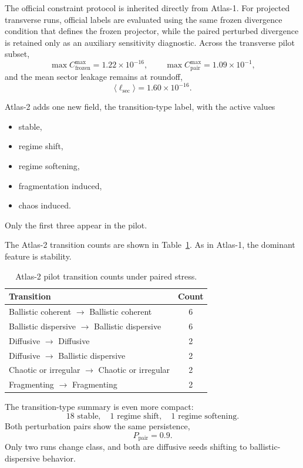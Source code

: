 \documentclass[11pt]{article}
\begin{document}
The official constraint protocol is inherited directly from Atlas-1. For projected transverse runs, official labels are evaluated using the same frozen divergence condition that defines the frozen projector, while the paired perturbed divergence is retained only as an auxiliary sensitivity diagnostic. Across the transverse pilot subset,
\begin{equation}
\max C^{\max}_{\mathrm{frozen}} = 1.22 \times 10^{-16},
\qquad
\max C^{\max}_{\mathrm{pair}} = 1.09 \times 10^{-1},
\end{equation}
and the mean sector leakage remains at roundoff,
\begin{equation}
\langle \ell_{\mathrm{sec}} \rangle = 1.60 \times 10^{-16}.
\end{equation}

Atlas-2 adds one new field, the transition-type label, with the active values
\begin{itemize}
\item stable,
\item regime shift,
\item regime softening,
\item fragmentation induced,
\item chaos induced.
\end{itemize}
Only the first three appear in the pilot.

The Atlas-2 transition counts are shown in Table~\ref{tab:atlas2-transitions}. As in Atlas-1, the dominant feature is stability.

\begin{table}[t]
\centering
\begin{tabular}{lc}
\hline
Transition & Count \\
\hline
Ballistic coherent $\rightarrow$ Ballistic coherent & 6 \\
Ballistic dispersive $\rightarrow$ Ballistic dispersive & 6 \\
Diffusive $\rightarrow$ Diffusive & 2 \\
Diffusive $\rightarrow$ Ballistic dispersive & 2 \\
Chaotic or irregular $\rightarrow$ Chaotic or irregular & 2 \\
Fragmenting $\rightarrow$ Fragmenting & 2 \\
\hline
\end{tabular}
\caption{Atlas-2 pilot transition counts under paired stress.}
\label{tab:atlas2-transitions}
\end{table}

The transition-type summary is even more compact:
\begin{equation}
18 \text{ stable},\quad 1 \text{ regime shift},\quad 1 \text{ regime softening}.
\end{equation}
Both perturbation pairs show the same persistence,
\begin{equation}
P_{\mathrm{pair}} = 0.9.
\end{equation}
Only two runs change class, and both are diffusive seeds shifting to ballistic-dispersive behavior.
\end{document}
